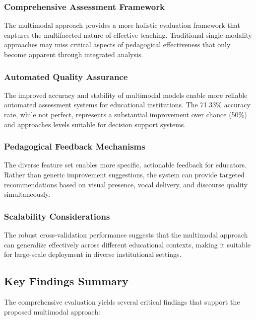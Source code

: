 \subsubsection{Comprehensive Assessment Framework}
The multimodal approach provides a more holistic evaluation framework that captures the multifaceted nature of effective teaching. Traditional single-modality approaches may miss critical aspects of pedagogical effectiveness that only become apparent through integrated analysis.

\subsubsection{Automated Quality Assurance}
The improved accuracy and stability of multimodal models enable more reliable automated assessment systems for educational institutions. The 71.33\% accuracy rate, while not perfect, represents a substantial improvement over chance (50\%) and approaches levels suitable for decision support systems.

\subsubsection{Pedagogical Feedback Mechanisms}
The diverse feature set enables more specific, actionable feedback for educators. Rather than generic improvement suggestions, the system can provide targeted recommendations based on visual presence, vocal delivery, and discourse quality simultaneously.

\subsubsection{Scalability Considerations}
The robust cross-validation performance suggests that the multimodal approach can generalize effectively across different educational contexts, making it suitable for large-scale deployment in diverse institutional settings.

\subsection{Key Findings Summary}

The comprehensive evaluation yields several critical findings that support the proposed multimodal approach:

